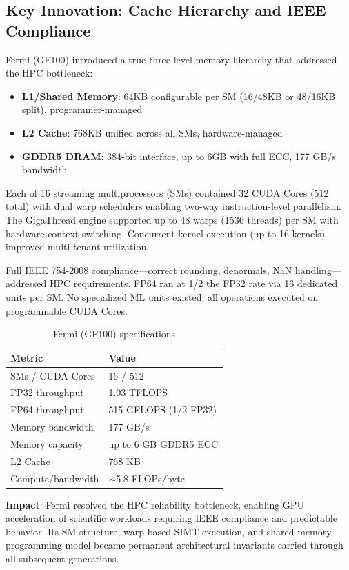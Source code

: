 \documentclass{article}
\begin{document}
\subsection{Key Innovation: Cache Hierarchy and IEEE Compliance}

Fermi (GF100) introduced a true three-level memory hierarchy that addressed the HPC bottleneck:
\begin{itemize}
\item \textbf{L1/Shared Memory}: 64KB configurable per SM (16/48KB or 48/16KB split), programmer-managed
\item \textbf{L2 Cache}: 768KB unified across all SMs, hardware-managed
\item \textbf{GDDR5 DRAM}: 384-bit interface, up to 6GB with full ECC, 177 GB/s bandwidth
\end{itemize}

Each of 16 streaming multiprocessors (SMs) contained 32 CUDA Cores (512 total) with dual warp schedulers enabling two-way instruction-level parallelism. The GigaThread engine supported up to 48 warps (1536 threads) per SM with hardware context switching. Concurrent kernel execution (up to 16 kernels) improved multi-tenant utilization.

Full IEEE 754-2008 compliance—correct rounding, denormals, NaN handling—addressed HPC requirements. FP64 ran at 1/2 the FP32 rate via 16 dedicated units per SM. No specialized ML units existed; all operations executed on programmable CUDA Cores.

\begin{table}[h]
\centering\small
\begin{tabular}{ll}
\toprule
Metric & Value \\
\midrule
SMs / CUDA Cores & 16 / 512 \\
FP32 throughput & 1.03 TFLOPS \\
FP64 throughput & 515 GFLOPS (1/2 FP32) \\
Memory bandwidth & 177 GB/s \\
Memory capacity & up to 6 GB GDDR5 ECC \\
L2 Cache & 768 KB \\
Compute/bandwidth & $\sim$5.8 FLOPs/byte \\
\bottomrule
\end{tabular}
\caption{Fermi (GF100) specifications}
\end{table}

\textbf{Impact}: Fermi resolved the HPC reliability bottleneck, enabling GPU acceleration of scientific workloads requiring IEEE compliance and predictable behavior. Its SM structure, warp-based SIMT execution, and shared memory programming model became permanent architectural invariants carried through all subsequent generations.
\end{document}

